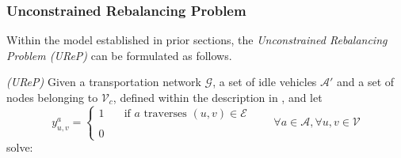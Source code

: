 \subsubsection*{Unconstrained Rebalancing Problem}
Within the model established in prior sections, the \textit{Unconstrained Rebalancing Problem (UReP)} can be formulated as follows. \\

\begin{algori}{\textit{(UReP)}}
	Given a transportation network $\mathcal{G}$, a set of idle vehicles $\mathcal{A'}$ and a set of nodes belonging to $ \mathcal{V}_c$, defined within the description in , and let \\
	\begin{equation*}
		y_{u,v}^a = 
		\begin{cases} 
			1 & \quad \text{if $a$ traverses } (u,v) \in \mathcal{E}\\
			\\
			0
		\end{cases}
		\quad\quad \forall a \in \mathcal{A}, \forall u,v \in \mathcal{V}
		\label{eq:binary_edges_reb}
	\end{equation*}
	solve:
\end{algori}\\
%

